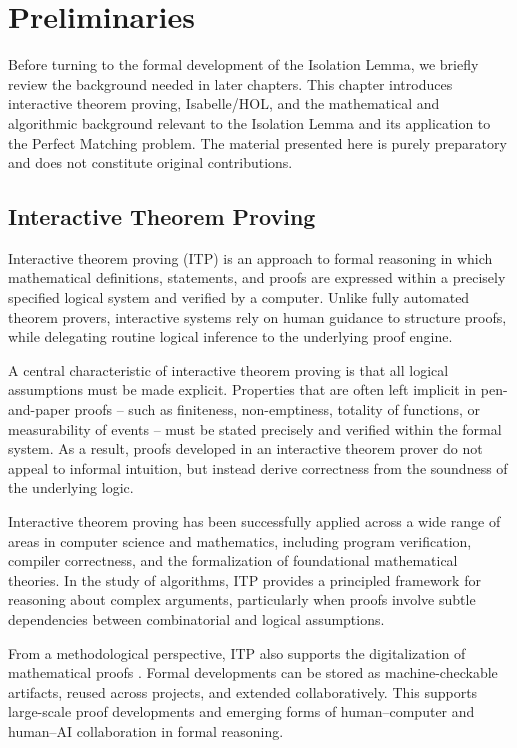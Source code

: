 \chapter{Preliminaries}
\label{chp:prelims}

Before turning to the formal development of the Isolation Lemma, we briefly review the background needed in later chapters.
This chapter introduces interactive theorem proving, Isabelle/HOL, and the mathematical and algorithmic background relevant to the Isolation Lemma and its application to the Perfect Matching problem.
The material presented here is purely preparatory and does not constitute original contributions.

\section{Interactive Theorem Proving}

Interactive theorem proving (ITP) is an approach to formal reasoning in which mathematical definitions, statements, and proofs are expressed within a precisely specified logical system and verified by a computer.
Unlike fully automated theorem provers, interactive systems rely on human guidance to structure proofs, while delegating routine logical inference to the underlying proof engine.

A central characteristic of interactive theorem proving is that all logical assumptions must be made explicit.
Properties that are often left implicit in pen-and-paper proofs -- such as finiteness, non-emptiness, totality of functions, or measurability of events -- must be stated precisely and verified within the formal system.
As a result, proofs developed in an interactive theorem prover do not appeal to informal intuition, but instead derive correctness from the soundness of the underlying logic.

Interactive theorem proving has been successfully applied across a wide range of areas in computer science and mathematics, including program verification, compiler correctness, and the formalization of foundational mathematical theories.
In the study of algorithms, ITP provides a principled framework for reasoning about complex arguments, particularly when proofs involve subtle dependencies between combinatorial and logical assumptions.

From a methodological perspective, ITP also supports the digitalization of mathematical proofs \cite{qed1994}.
Formal developments can be stored as machine-checkable artifacts, reused across projects, and extended collaboratively.
This supports large-scale proof developments and emerging forms of human--computer and human--AI collaboration in formal reasoning.

